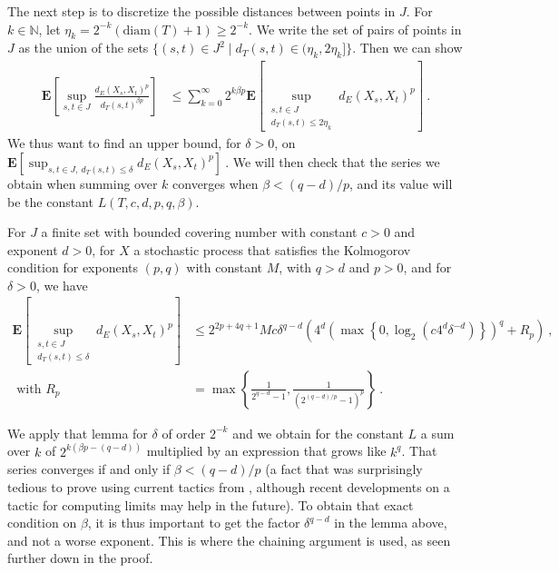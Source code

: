 \documentclass[lean]{Draft}
\makeatletter
\newcommand\leanlink{\begingroup\catcode`\#=12\relax\@leanlink}
\newcommand\@leanlink[2]{\endgroup
\href{#1}
{\texttt{\detokenize{#2}}}}
\newcommand{\docs}[1]{%
\leanlink{https://remydegenne.github.io/brownian-motion/docs/find/?pattern=#1\#doc}
{#1}}
\makeatother
\begin{document}
The next step is to discretize the possible distances between points in $J$.
For $k \in \mathbb{N}$, let $\eta_k = 2^{-k}(\mathrm{diam}(T) + 1) \ge 2^{-k}$.
We write the set of pairs of points in $J$ as the union of the sets $\{(s, t) \in J^2 \mid d_T(s, t) \in (\eta_k, 2\eta_k]\}$.
Then we can show
\begin{align*}
  \mathbf{E}\left[ \sup_{s, t \in J} \frac{d_E(X_s, X_t)^p}{d_T(s, t)^{\beta p}} \right]
  &\le \sum_{k=0}^\infty 2^{k \beta p} \mathbf{E}\left[ \sup_{\substack{s, t \in J \\ d_T(s, t) \le 2\eta_k}} d_E(X_s, X_t)^p \right]
  \: .
\end{align*}
We thus want to find an upper bound, for $\delta > 0$, on
$
  \mathbf{E}\left[ \sup_{s, t \in J,\: d_T(s, t) \le \delta} d_E(X_s, X_t)^p \right]
  \: .
$
We will then check that the series we obtain when summing over $k$ converges when $\beta < (q - d)/p$, and its value will be the constant $L(T, c, d, p, q, \beta)$.

\begin{lemma}[\docs{ProbabilityTheory.finite_set_bound_of_edist_le}]\label{lem:finite_set_bound_of_dist_le}
For $J$ a finite set with bounded covering number with constant $c > 0$ and exponent $d > 0$, for $X$ a stochastic process that satisfies the Kolmogorov condition for exponents $(p, q)$ with constant $M$, with $q > d$ and $p > 0$, and for $\delta > 0$, we have
\begin{align*}
  \mathbf{E}\left[ \sup_{\substack{s, t \in J \\ d_T(s, t) \le \delta}} d_E(X_s, X_t)^p \right]
  &\le 2^{2p+4q+1} M c \delta^{q-d}\left( 4^d \left(\max\left\{0, \log_2 \left(c 4^d \delta^{-d}\right)\right\}\right)^q + R_p \right)
  \: ,
  \\
  \text{ with } R_p
  &= \max\left\{\frac{1}{2^{q-d} - 1}, \frac{1}{(2^{(q-d)/p} - 1)^p}\right\}
  \: .
\end{align*}
\end{lemma}

We apply that lemma for $\delta$ of order $2^{-k}$ and we obtain for the constant $L$ a sum over $k$ of $2^{k(\beta p - (q - d))}$ multiplied by an expression that grows like $k^q$.
That series converges if and only if $\beta < (q - d)/p$ (a fact that was surprisingly tedious to prove using current tactics from \mathlib, although recent developments on a tactic for computing limits may help in the future).
To obtain that exact condition on $\beta$, it is thus important to get the factor $\delta^{q-d}$ in the lemma above, and not a worse exponent.
This is where the chaining argument is used, as seen further down in the proof.
\end{document}
